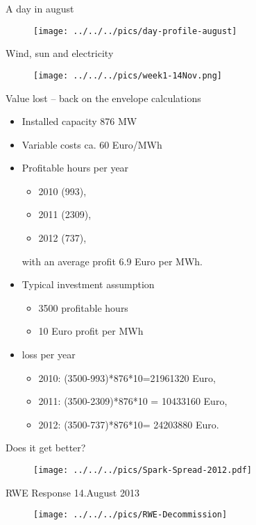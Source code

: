 {A day in august}
\begin{figure}[htp]
\centering
\texttt{[image: ../../../pics/day-profile-august]}
\end{figure}

{Wind, sun and electricity}
\begin{figure}[htp]
\centering
\texttt{[image: ../../../pics/week1-14Nov.png]}
\end{figure}

{Value lost -- back on the envelope calculations}
\begin{itemize}
\item<1-> Installed capacity 876 MW
\item<2-> Variable costs ca. 60 Euro/MWh
\item<3-> Profitable hours per year
\begin{itemize}
\item  2010 (993),
\item 2011 (2309),
\item 2012 (737),
\end{itemize}
with an average profit 6.9 Euro per MWh.
\item<4-> Typical investment assumption
\begin{itemize}
\item 3500 profitable hours
\item 10 Euro profit per MWh
\end{itemize}
\item<5-> loss per year
\begin{itemize}
\item  2010: (3500-993)*876*10=21961320 Euro,
\item 2011:  (3500-2309)*876*10 = 10433160 Euro,
\item 2012: (3500-737)*876*10= 24203880 Euro.
\end{itemize}

\end{itemize}


{Does it get better?}
\begin{figure}[htp]
\centering
\texttt{[image: ../../../pics/Spark-Spread-2012.pdf]}
\end{figure}

{RWE Response 14.August 2013}
\begin{figure}[htp]
\centering
\texttt{[image: ../../../pics/RWE-Decommission]}
\end{figure}

